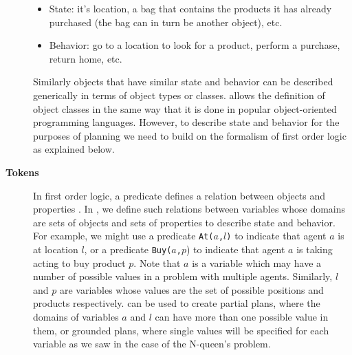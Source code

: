 \begin{description}
  \begin{itemize}

  \item State: it's location, a bag that contains the products it has
    already purchased (the bag can in turn be another object), etc.

  \item Behavior: go to a location to look for a product, perform a
    purchase, return home, etc.

  \end{itemize}

  Similarly objects that have similar state and behavior can be
  described generically in terms of object types or classes. \eu
  allows the definition of object classes in the same way that it is
  done in popular object-oriented programming languages. However, to
  describe state and behavior for the purposes of planning we need to
  build on the formalism of first order logic as explained below.

\item[\textbf{Tokens}] In first order logic, a predicate defines a
  relation between objects and properties .  In
  \eu, we define such relations between variables whose domains are
  sets of objects and sets of properties to describe state and
  behavior. For example, we might use a predicate \texttt{At($a$,$l$)}
  to indicate that agent $a$ is at location $l$, or a predicate
  \texttt{Buy($a$,$p$}) to indicate that agent $a$ is taking acting to
  buy product $p$. Note that $a$ is a variable which may have a number
  of possible values in a problem with multiple agents. Similarly, $l$
  and $p$ are variables whose values are the set of possible positions
  and products respectively. \eu can be used to create partial plans,
  where the domains of variables $a$ and $l$ can have more than one
  possible value in them, or grounded plans, where single values will
  be specified for each variable as we saw in the case of the
  N-queen's problem.


\end{description}
